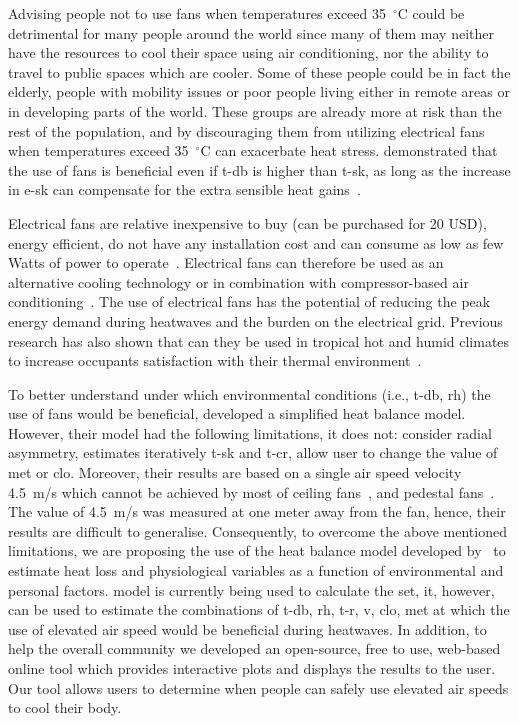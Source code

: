Advising people not to use fans when temperatures exceed 35~$^{\circ}$C could be detrimental for many people around the world since many of them may neither have the resources to cool their space using air conditioning, nor the ability to travel to public spaces which are cooler.
Some of these people could be in fact the elderly, people with mobility issues or poor people living either in remote areas or in developing parts of the world.
These groups are already more at risk than the rest of the population, and by discouraging them from utilizing electrical fans when temperatures exceed 35~$^{\circ}$C can exacerbate heat stress.
 demonstrated that the use of fans is beneficial even if \ac{t-db} is higher than \ac{t-sk}, as long as the increase in \ac{e-sk} can compensate for the extra sensible heat gains~\cite{Jay2015}.

Electrical fans are relative inexpensive to buy (can be purchased for 20 USD), energy efficient, do not have any installation cost and can consume as low as few Watts of power to operate~\cite{Jay2019a, Yang2015a, Lipczynska2018a}.
Electrical fans can therefore be used as an alternative cooling technology or in combination with compressor-based air conditioning~\cite{Jay2019a, Yang2015a, Lipczynska2018a}.
The use of electrical fans has the potential of reducing the peak energy demand during heatwaves and the burden on the electrical grid.
Previous research has also shown that can they be used in tropical hot and humid climates to increase occupants satisfaction with their thermal environment~\cite{Lipczynska2018a}.

To better understand under which environmental conditions (i.e., \ac{t-db}, \ac{rh}) the use of fans would be beneficial,  developed a simplified heat balance model.
However, their model had the following limitations, it does not: consider radial asymmetry, estimates iteratively \ac{t-sk} and \ac{t-cr}, allow user to change the value of \ac{met} or \ac{clo}.
Moreover, their results are based on a single air speed velocity 4.5~m/s which cannot be achieved by most of ceiling fans~\cite{Raftery2019}, and pedestal fans~\cite{Yang2015a}.
The value of 4.5~m/s was measured at one meter away from the fan, hence, their results are difficult to generalise.
Consequently, to overcome the above mentioned limitations, we are proposing the use of the heat balance model developed by~ to estimate heat loss and physiological variables as a function of environmental and personal factors.
 model is currently being used to calculate the \ac{set}, it, however, can be used to estimate the combinations of \ac{t-db}, \ac{rh}, \ac{t-r}, \ac{v}, \ac{clo}, \ac{met} at which the use of elevated air speed would be beneficial during heatwaves.
In addition, to help the overall community we developed an open-source, free to use, web-based online tool which provides interactive plots and displays the results to the user.
Our tool allows users to determine when people can safely use elevated air speeds to cool their body.

